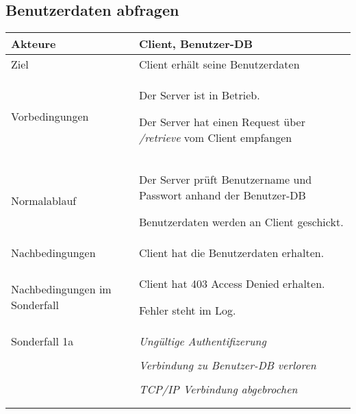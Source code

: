 \documentclass[a4paper,10pt,titlepage,parskip=true]{article}
\makeatletter
\newcommand\novspace{\@minipagetrue}
\newenvironment{owncompactitem}{%
\compactitem
}{%
\@finalstrut\@arstrutbox
\@nameuse{endcompactitem}%
\aftergroup\let\aftergroup\@finalstrut\aftergroup\@gobble
}
\newenvironment{owncompactenum}{%
\compactenum
}{%
\@finalstrut\@arstrutbox
\@nameuse{endcompactenum}%
\aftergroup\let\aftergroup\@finalstrut\aftergroup\@gobble
}
\newcommand{\usecase}[7]
{\subsection{#1}
\setlength{\extrarowheight}{2pt}
\begin{tabular}{|p{0.2\textwidth}|p{0.9\textwidth}|}
\hline
  Akteure & #2\\\hline
  Ziel & #3\\\hline
  Vorbedingungen & \novspace
  	\begin{owncompactitem}[-] #4 \end{owncompactitem} \\\hline
  Normalablauf & \vspace{-7pt}
  	\begin{owncompactenum}[1.] #6 \end{owncompactenum} \\\hline
  Nachbedingungen & \novspace
  	\begin{owncompactitem}[-] #5 \end{owncompactitem} \\\hline
  #7
\end{tabular}
}
\newcommand{\sonderfall}[4][\empty]
{
Sonderfall #2 & \vspace{-10pt}
	\textit{#3}
	\begin{owncompactenum}[{#2}.1] {#4} \end{owncompactenum}
  	\ifthenelse{\equal{#1}{\empty}}
    	{\\\hline} %
    	{\ensuremath{\rightarrow} #1 \\ [+1pt] \hline} %

}
\newcommand{\sondernachbedingung}[1]
{
Nachbedingungen im Sonderfall& \novspace
	\begin{owncompactitem}[-]
		#1
	\end{owncompactitem} \\\hline
}
\makeatother
\begin{document}
\usecase{Benutzerdaten abfragen}{Client, Benutzer-DB}%
{Client erhält seine Benutzerdaten}%
{%
  \item Der Server ist in Betrieb.
  \item Der Server hat einen Request über \textit{/retrieve} vom Client empfangen
}
{%
  \item Client hat die Benutzerdaten erhalten.
}
{%
  \item Der Server prüft Benutzername und Passwort anhand der Benutzer-DB
  \item Benutzerdaten werden an Client geschickt.
}
{%
  \sondernachbedingung{
	\item Client hat 403 Access Denied erhalten.
	\item Fehler steht im Log.
	}
	
	\sonderfall[Weiter mit normalem Betrieb]{1a}
    {Ungültige Authentifizerung}
    {
    \item Fehler wird ins Log geschrieben
  	\item Der Client erhält eine entsprechende Fehlermeldung mit HTTP-Status 403 Access Denied
    }

	 \sonderfall[Kritischer Fehler, Server ist beendet]{*}%
	{Verbindung zu Benutzer-DB verloren}%
  	{
	\item Der Fehler wird ins Log geschrieben (als schwerwiegender Fehler)
	\item Der Client erhält eine entsprechende Fehlermeldung
	\item Der Server wird beendet
  	}

\sonderfall[Weiter mit normalem Betrieb]{**}%
	{TCP/IP Verbindung abgebrochen}%
	{
	\item Fehlermeldung wird ins Log geschrieben
	}
}
\end{document}
